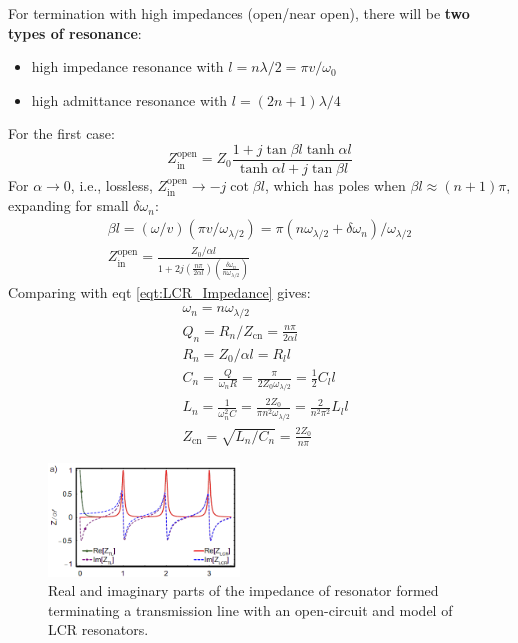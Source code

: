 \documentclass[8pt,a4paper,twocolumn]{article} %
\numberwithin{equation}{section} %
\begin{document}
			For termination with high impedances (open/near open), there will be \textbf{two types of resonance}:
			\begin{itemize}
				\item high impedance resonance with $ l=n \lambda/2=\pi v/\omega_0 $
				\item high admittance resonance with $ l=(2n+1)\lambda/4 $
			\end{itemize}
			For the first case:
			\begin{equation}
				Z_{\text{in}}^{\text{open}}=Z_0 \frac{1+j\tan \beta l\tanh \alpha l}{\tanh \alpha l+j\tan \beta l}
			\end{equation}
			For $ \alpha \rightarrow 0 $, i.e., lossless, $ Z_{\text{in}}^{\text{open}} \rightarrow -j\cot \beta l $, which has poles when $ \beta l\approx (n+1)\pi $, expanding for small $ \delta \omega_n $:
			\begin{gather}
				\beta l=(\omega/v)(\pi v/\omega_{\lambda/2})=\pi(n \omega_{\lambda/2} + \delta \omega_n)/\omega_{\lambda/2}\\
				Z_{\text{in}}^{\text{open}}=\frac{Z_0/\alpha l}{1+2j \left( \frac{n \pi}{2 \alpha l} \right) \left( \frac{\delta \omega_n}{n \omega_{\lambda/2}} \right) }
			\end{gather}
			Comparing with eqt \ref{eqt:LCR_Impedance} gives:
			\begin{align}
				&\omega_n = n \omega_{\lambda/2}\\
				&Q_n=R_n /Z_{\text{cn}}=\frac{n \pi}{2 \alpha l}\\
				&R_n = Z_0/ \alpha l = R_l l\\
				&C_n = \frac{Q}{\omega_n R}=\frac{\pi}{2Z_0 \omega_{\lambda/2}}=\frac{1}{2}C_l l\\
				&L_n=\frac{1}{\omega_n^2C}=\frac{2Z_0}{\pi n^2 \omega_{\lambda/2}}=\frac{2}{n^2 \pi^2}L_ll\\
				&Z_{\text{cn}}=\sqrt{L_n/C_n}=\frac{2Z_0}{n \pi}
			\end{align}
			\begin{figure}[!h]
				\centering
				\includegraphics[width=2in]{LCRapprox.png}
				\caption{Real and imaginary parts of the impedance of resonator formed terminating a transmission line with an open-circuit and model of LCR resonators. \cite{Schuster2007}}
				\label{pic:LCRapprox}
			\end{figure}
\end{document}
